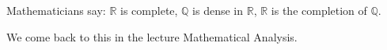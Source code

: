 Mathematicians say: $\mathbb{R}$ is complete, $\mathbb{Q}$ is dense in $\mathbb{R}$, $\mathbb{R}$ is the completion of $\mathbb{Q}$. 

We come back to this in the lecture Mathematical Analysis.









